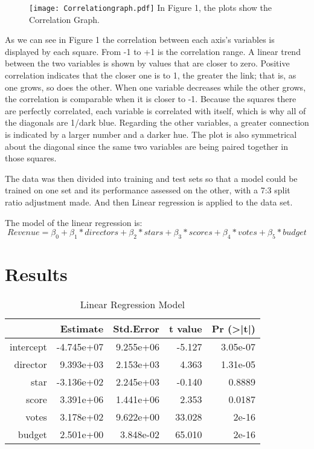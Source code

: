 \documentclass[12pt]{article}
\begin{document}
\begin{figure}
  \centering
	\texttt{[image: Correlationgraph.pdf]}
	\label{fig:Correlationgraph}
In Figure 1, the plots show the Correlation Graph.
\end{figure}

As we can see in Figure 1 the correlation between each axis’s variables is displayed by each square. From 
-1 to +1 is the correlation range. A linear trend between the two variables is shown
by values that are closer to zero. Positive correlation indicates that the closer one 
is to 1, the greater the link; that is, as one grows, so does the other. When one variable 
decreases while the other grows, the correlation is comparable when it is closer to -1.
Because the squares there are perfectly correlated, each variable is correlated with itself,
which is why all of the diagonals are 1/dark blue. Regarding the other variables, a greater 
connection is indicated by a larger number and a darker hue. The plot is also symmetrical
about the diagonal since the same two variables are being paired together in those squares.

The data was then divided into training and test sets so that a model could be 
trained on one set and its performance assessed on the other, with a 7:3 split 
ratio adjustment made. And then Linear regression is applied to 
the data set.

The model of the linear regression is:
\begin{equation}
 Revenue = \beta_0 + \beta_1 * directors + \beta_2 * stars + \beta_3 * scores + \beta_4 *votes + \beta_5* budget 
\end{equation}

\section{Results}
\label{sec:res}

\begin{table}[h]
\caption{Linear Regression Model}
\centering
\begin{tabular}{rrrrr}
\hline
 & Estimate   & Std.Error & t value & Pr (\textgreater|t|) \\
 \hline
intercept & -4.745e+07 & 9.255e+06 & -5.127  & 3.05e-07 \\ 
director  & 9.393e+03  & 2.153e+03 & 4.363   & 1.31e-05 \\ 
star      & -3.136e+02 & 2.245e+03 & -0.140  & 0.8889 \\ 
score     & 3.391e+06  & 1.441e+06 & 2.353   & 0.0187 \\ 
votes     & 3.178e+02  & 9.622e+00 & 33.028  & 2e-16 \\ 
budget    & 2.501e+00  & 3.848e-02 & 65.010  & 2e-16 \\
\hline
\end{tabular}
\end{table}
\end{document}
